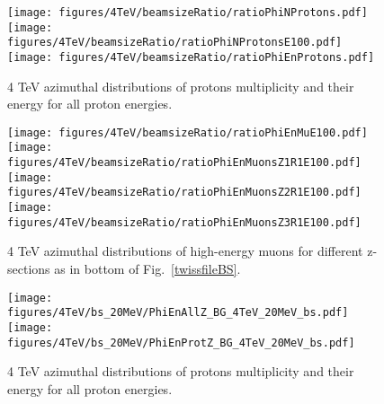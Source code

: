 \begin{figure}[!htb]
\begin{center}

  \texttt{[image: figures/4TeV/beamsizeRatio/ratioPhiNProtons.pdf]}
  \texttt{[image: figures/4TeV/beamsizeRatio/ratioPhiNProtonsE100.pdf]}
  \texttt{[image: figures/4TeV/beamsizeRatio/ratioPhiEnProtons.pdf]}
\end{center}
\vspace{-0.6cm}
 \caption{4 TeV azimuthal distributions of protons multiplicity and their energy for all proton energies.
  \label{bsRatioPhiNPr}}
\end{figure}

\begin{figure}[!htb]
\begin{center}
  \texttt{[image: figures/4TeV/beamsizeRatio/ratioPhiEnMuE100.pdf]}
  \texttt{[image: figures/4TeV/beamsizeRatio/ratioPhiEnMuonsZ1R1E100.pdf]}
  \texttt{[image: figures/4TeV/beamsizeRatio/ratioPhiEnMuonsZ2R1E100.pdf]}
  \texttt{[image: figures/4TeV/beamsizeRatio/ratioPhiEnMuonsZ3R1E100.pdf]}
\end{center}
\vspace{-0.6cm}
 \caption{4 TeV azimuthal distributions of high-energy muons for different z-sections as in bottom of Fig.~\ref{twissfileBS}.
  \label{bsRatioPhiEnMu}}
\end{figure}

\begin{figure}[!htb]
\begin{center}
  \texttt{[image: figures/4TeV/bs\_20MeV/PhiEnAllZ\_BG\_4TeV\_20MeV\_bs.pdf]}
  \texttt{[image: figures/4TeV/bs\_20MeV/PhiEnProtZ\_BG\_4TeV\_20MeV\_bs.pdf]}
\end{center}
\vspace{-0.6cm}
 \caption{4 TeV azimuthal distributions of protons multiplicity and their energy for all proton energies.
  \label{bsZ}}
\end{figure}

